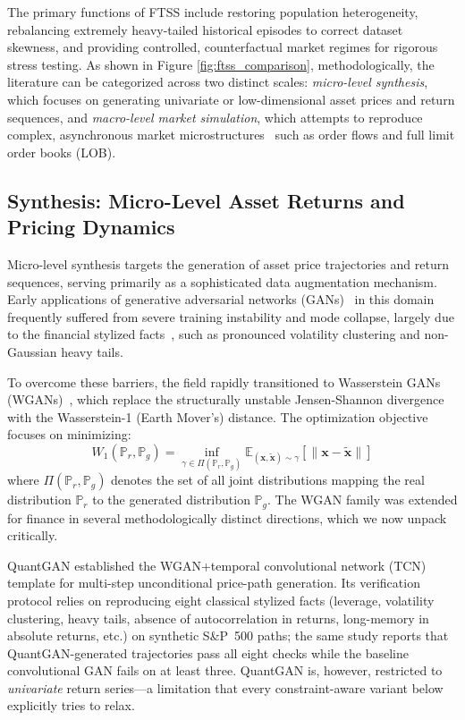 \documentclass[11pt,a4paper]{article}
\begin{document}
The primary functions of FTSS include restoring population heterogeneity, rebalancing extremely heavy-tailed historical episodes to correct dataset skewness, and providing controlled, counterfactual market regimes for rigorous stress testing. As shown in Figure \ref{fig:ftss_comparison}, methodologically, the literature can be categorized across two distinct scales: \textit{micro-level synthesis}, which focuses on generating univariate or low-dimensional asset prices and return sequences, and \textit{macro-level market simulation}, which attempts to reproduce complex, asynchronous market microstructures~\citep{ohara1995market,gould2013limit} such as order flows and full limit order books (LOB).

\subsection{Synthesis: Micro-Level Asset Returns and Pricing Dynamics}

Micro-level synthesis targets the generation of asset price trajectories and return sequences, serving primarily as a sophisticated data augmentation mechanism. Early applications of generative adversarial networks (GANs)~\citep{goodfellow2014gan} in this domain frequently suffered from severe training instability and mode collapse, largely due to the financial stylized facts~\citep{cont2001empirical,mandelbrot1963variation}, such as pronounced volatility clustering and non-Gaussian heavy tails.

To overcome these barriers, the field rapidly transitioned to Wasserstein GANs (WGANs)~\citep{arjovsky2017wgan,naritomi2020data}, which replace the structurally unstable Jensen-Shannon divergence with the Wasserstein-1 (Earth Mover's) distance. The optimization objective focuses on minimizing:
\begin{equation}
W_1(\mathbb{P}_r, \mathbb{P}_g) = \inf_{\gamma \in \Pi(\mathbb{P}_r, \mathbb{P}_g)} \mathbb{E}_{(\mathbf{x}, \tilde{\mathbf{x}}) \sim \gamma}[\|\mathbf{x} - \tilde{\mathbf{x}}\|]
\end{equation}
where $\Pi(\mathbb{P}_r, \mathbb{P}_g)$ denotes the set of all joint distributions mapping the real distribution $\mathbb{P}_r$ to the generated distribution $\mathbb{P}_g$. The WGAN family was extended for finance in several methodologically distinct directions, which we now unpack critically.

QuantGAN \citep{wiese2020} established the WGAN+temporal convolutional network (TCN)~\citep{bai2018empirical} template for multi-step unconditional price-path generation. Its verification protocol relies on reproducing eight classical stylized facts (leverage, volatility clustering, heavy tails, absence of autocorrelation in returns, long-memory in absolute returns, etc.) on synthetic S\&P~500 paths; the same study reports that QuantGAN-generated trajectories pass all eight checks while the baseline convolutional GAN fails on at least three. QuantGAN is, however, restricted to \emph{univariate} return series---a limitation that every constraint-aware variant below explicitly tries to relax.
\end{document}
